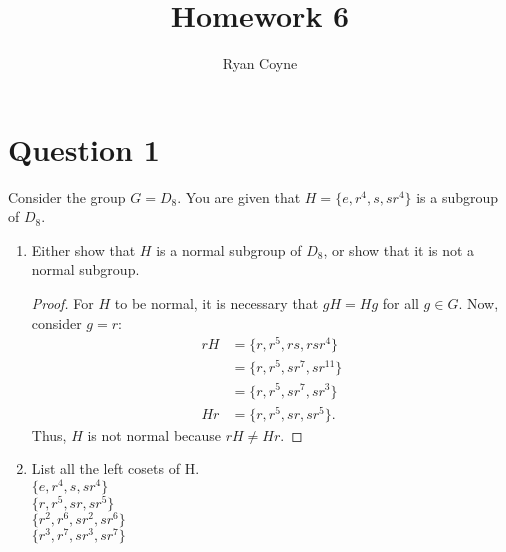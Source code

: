 \documentclass[12pt]{article}
\title{Homework 6}
\author{Ryan Coyne}
\begin{document}
\maketitle

\section*{Question 1}
    Consider the group \(G = D_8\). You are given that \(H = \{e , r^4, s, sr^4\}\) is a subgroup of \(D_8\).
    \begin{enumerate}[label=\alph*)]
        \item Either show that \(H\) is a normal subgroup of \(D_8\), or show that it is not a normal subgroup.\\
        \begin{proof}
            For \(H\) to be normal, it is necessary that \(gH = Hg\) for all \(g\in G\). Now, consider \(g = r\): 
            \begin{equation*}
                \begin{split}
                    rH &= \{r, r^5, rs, rsr^4\}\\
                    &= \{r, r^5, sr^7, sr^{11}\}\\
                    &= \{r, r^5, sr^7, sr^{3}\}\\
                    Hr &= \{r, r^5, sr, sr^5\}.
                \end{split}
            \end{equation*}
            Thus, \(H\) is not normal because \(rH \neq Hr\).
        \end{proof}
        \item List all the left cosets of H.\\
        \(\{e, r^{4}, s, sr^{4}\}\) \\
        $\{r, r^{5}, sr, sr^{5}\}$ \\
        $\{r^{2}, r^{6}, sr^{2}, sr^{6}\}$ \\
        $\{r^{3}, r^{7}, sr^{3}, sr^{7}\}$ \\
    \end{enumerate}
    \break
\end{document}
